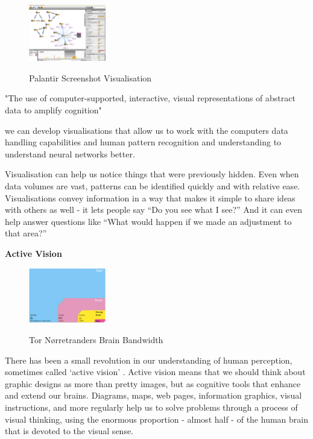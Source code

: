 \documentclass[a4paper,11pt,titlepage]{article}
\begin{document}
		\begin{figure}[H]
    			\centering	
			{{\includegraphics[width=0.3\textwidth]
    				{img/palantir_01.png} 
    			}}%
    			\caption{Palantir Screenshot Visualisation}%
    		\label{fig:Palantir}
		\end{figure}


"The use of computer-supported, interactive, visual representations of abstract data to amplify cognition" \cite{card1999}

we can develop visualisations that allow us to work with the computers data handling capabilities and human pattern recognition and understanding to understand neural networks better. 

Visualisation can help us notice things that were previously hidden. Even when data volumes are vast, patterns can be identified quickly and with relative ease. Visualisations convey information in a way that makes it simple to share ideas with others as well -  it lets people say “Do you see what I see?” And it can even help answer questions like “What would happen if we made an adjustment to that area?”


\textbf{Active Vision}
		
		\begin{figure}[H]
    			\centering	
			{{\includegraphics[width=0.3\textwidth]
    				{img/brain_bandwidth.png} 
    			}}%
    			\caption{Tor Nørretranders Brain Bandwidth}%
    		\label{fig:TufteExcellence}
		\end{figure}

 		There has been a small revolution in our understanding of human perception, sometimes called `active vision' \cite{Ware2010}. Active vision means that we should think about graphic designs as more than pretty images, but as cognitive tools that enhance and extend our brains. Diagrams, maps, web pages, information graphics, visual instructions, and more regularly help us to solve problems through a process of visual thinking, using the enormous proportion - almost half - of the human brain that is devoted to the visual sense.  
	
\end{document}
